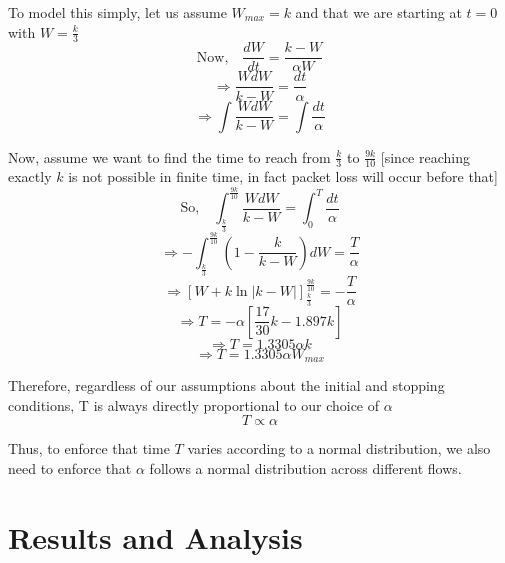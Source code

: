 \documentclass[12pt,a4paper]{report}
\begin{document}
To model this simply, let us assume $W_{max} = k$ and that we are starting at $t = 0$ with $W = \frac{k}{3}$
\begin{equation*}
\text{Now,} \quad \frac{dW}{dt} = \frac{k-W}{\alpha W}
\end{equation*}
\begin{equation*}
\Rightarrow \frac{W dW}{k-W} = \frac{dt}{\alpha}
\end{equation*}
\begin{equation*}
\Rightarrow \int \frac{W dW}{k-W} = \int \frac{dt}{\alpha}
\end{equation*}

Now, assume we want to find the time to reach from $\frac{k}{3}$ to $\frac{9k}{10}$ [since reaching exactly $k$ is not possible in finite time, in fact packet loss will occur before that]
\begin{equation*}
\text{So,} \quad \int_{\frac{k}{3}}^{\frac{9k}{10}} \frac{W dW}{k-W} = \int_{0}^{T} \frac{dt}{\alpha}
\end{equation*}
\begin{equation*}
\Rightarrow -\int_{\frac{k}{3}}^{\frac{9k}{10}} \left(1 - \frac{k}{k-W}\right) dW = \frac{T}{\alpha}
\end{equation*}
\begin{equation*}
\Rightarrow \left[W + k\ln|k-W|\right]_{\frac{k}{3}}^{\frac{9k}{10}} = -\frac{T}{\alpha}
\end{equation*}
\begin{equation*}
\Rightarrow T = -\alpha\left[\frac{17}{30}k - 1.897k\right]
\end{equation*}
\begin{equation*}
\Rightarrow T = 1.3305\alpha k
\end{equation*}
\begin{equation*}
\Rightarrow T = 1.3305\alpha W_{max}
\end{equation*}

Therefore, regardless of our assumptions about the initial and stopping conditions, T is always directly proportional to our choice of $\alpha$
\begin{equation*}
T \propto \alpha
\end{equation*}

Thus, to enforce that time $T$ varies according to a normal distribution, we also need to enforce that $\alpha$ follows a normal distribution across different flows.
\newpage
\chapter{Results and Analysis}
\end{document}
